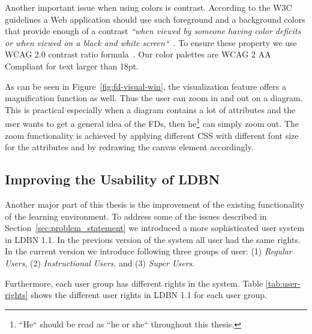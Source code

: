 
Another important issue when using colors is contrast. 
According to the W3C guidelines a Web application should use such
foreground and a background colors that provide enough of a
contrast \emph{``when viewed by someone having color deficits or when 
viewed on a black and white screen``}~\cite{w3c1}.
To ensure these property we use WCAG 2.0 contrast ratio formula~\cite{w3c2}.
Our color palettes are WCAG 2 AA Compliant for text larger than 18pt.

As can be seen in Figure~\ref{fig:fd-visual-win}, 
the visualization feature offers a magnification function as well. 
Thus the user can zoom in and out on a diagram.
This is practical especially when a
diagram contains a lot of attributes and the user 
wants to get a general idea of the FDs, then 
he\footnote{``He`` should be read as ``he or she`` throughout this thesis.} can
simply zoom out. 
The zoom functionality
is achieved by applying different CSS with different font 
size for the attributes and by redrawing the canvas element accordingly. 

\subsection{Improving the Usability of LDBN}
\label{sec:improving}

Another major part of this thesis is the improvement of the
existing functionality of the learning environment. 
To address some of the issues described in 
Section~\ref{sec:problem_statement} we introduced a more sophisticated user system in 
LDBN 1.1. In the previous version of the system all user had the same rights. 
In the current version we introduce following three groups of user:
(1) \emph{Regular Users}, (2) \emph{Instructional Users}, and (3) \emph{Super Users}.

Furthermore, each user group has different rights in the system. 
Table \ref{tab:user-rights} shows the different user rights in LDBN 1.1 for each user group. 

